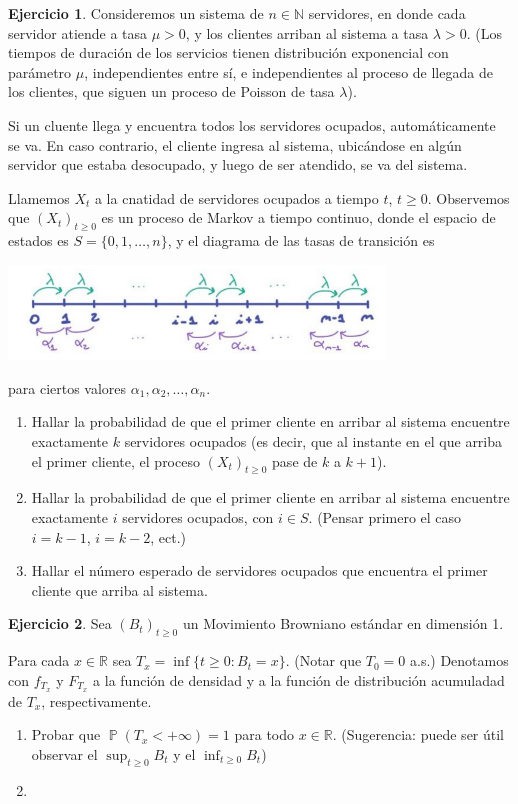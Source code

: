 \documentclass{article}
\DeclareMathOperator{\prob}{\mathbb{P}}
\newcommand{\naturalnum}{\mathbb{N}}
\newcommand{\realnum}{\mathbb{R}}
\theoremstyle{definition}
\newtheorem{exercise}{Ejercicio}
\begin{document}
\begin{exercise}
Consideremos un sistema de $n \in \naturalnum$ servidores, en donde cada servidor atiende a tasa $\mu > 0$, y los clientes arriban al sistema a tasa $\lambda > 0$.
(Los tiempos de duración de los servicios tienen distribución exponencial con parámetro $\mu$, independientes entre sí, e independientes al proceso de llegada de los clientes, que siguen un proceso de Poisson de tasa $\lambda$).

Si un cluente llega y encuentra todos los servidores ocupados, automáticamente se va.
En caso contrario, el cliente ingresa al sistema, ubicándose en algún servidor que estaba desocupado, y luego de ser atendido, se va del sistema.

Llamemos $X_t$ a la cnatidad de servidores ocupados a tiempo $t$, $t \geq 0$.
Observemos que $(X_t)_{t \geq 0}$ es un proceso de Markov a tiempo continuo, donde el espacio de estados es $S = \{0, 1, \dots, n\}$, y el diagrama de las tasas de transición es
\begin{center}
\includegraphics[width=0.75\textwidth]{diagrama_de_las_tasas_de_transicion}
\end{center}
para ciertos valores $\alpha_1, \alpha_2, \dots, \alpha_n$.
\begin{enumerate}[label=\roman*.]
	\item Hallar la probabilidad de que el primer cliente en arribar al sistema encuentre exactamente $k$ servidores ocupados (es decir, que al instante en el que arriba el primer cliente, el proceso $(X_t)_{t \geq 0}$ pase de $k$ a $k + 1$).
	\item Hallar la probabilidad de que el primer cliente en arribar al sistema encuentre exactamente $i$ servidores ocupados, con $i \in S$.
(Pensar primero el caso $i = k - 1$, $i = k - 2$, ect.)
	\item Hallar el número esperado de servidores ocupados que encuentra el primer cliente que arriba al sistema.
\end{enumerate}
\end{exercise}

\begin{exercise}
Sea $(B_t)_{t \geq 0}$ un Movimiento Browniano estándar en dimensión 1.

Para cada $x \in \realnum$ sea $T_x = \inf \{t \geq 0 : B_t = x\}$.
(Notar que \(T_0 = 0\) a.s.)
Denotamos con \(f_{T_x}\) y \(F_{T_x}\) a la función de densidad y a la función de distribución acumuladad de \(T_x\), respectivamente.
\begin{enumerate}[label=\alph*)]
	\item Probar que \(\prob(T_x < + \infty) = 1\) para todo \(x \in \realnum\).
	(Sugerencia: puede ser útil observar el \(\sup_{t \geq 0} B_t\) y el \(\inf_{t \geq 0} B_t\))
	\item
\end{enumerate}
\end{exercise}
\end{document}
